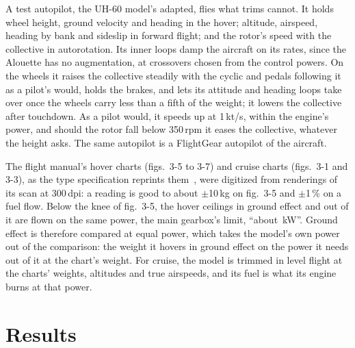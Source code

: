 \documentclass[10pt,a4paper,twocolumn]{article}
\begin{document}
A test autopilot, the UH-60 model's adapted, flies what trims cannot. It holds wheel height, ground velocity and heading in the hover;
altitude, airspeed, heading by bank and sideslip in forward flight; and the rotor's speed with the collective in autorotation. Its inner
loops damp the aircraft on its rates, since the Alouette has no augmentation, at crossovers chosen from the control powers. On the wheels
it raises the collective steadily with the cyclic and pedals following it as a pilot's would, holds the brakes, and lets its attitude and
heading loops take over once the wheels carry less than a fifth of the weight; it lowers the collective after touchdown. As a pilot
would, it speeds up at 1\,kt/s, within the engine's power, and should the rotor fall below 350\,rpm it eases the collective, whatever
the height asks. The same autopilot is a FlightGear autopilot of the aircraft.

The flight manual's hover charts (figs.\ 3-5 to 3-7) and cruise charts (figs.\ 3-1 and 3-3), as the type specification reprints
them~\cite{spec}, were digitized from renderings of its scan at 300\,dpi: a reading is good to about $\pm$10\,kg on fig.\ 3-5 and
$\pm$1\,\% on a fuel flow. Below the knee of fig.\ 3-5, the hover ceilings in ground effect and out of it are flown on the same power,
the main gearbox's limit, ``about \NChartKw\,kW''. Ground effect is therefore compared at equal power, which takes the model's own
power out of the comparison: the weight it hovers in ground effect on the power it needs out of it at the chart's weight. For cruise, the
model is trimmed in level flight at the charts' weights, altitudes and true airspeeds, and its fuel is what its engine burns at that
power.

\section{Results}\label{sec:results}
\end{document}
